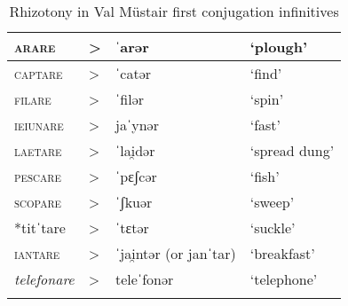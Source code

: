 \documentclass[output=paper,
modfonts
]{LSP/langsci}
\begin{document}
\begin{longtable}[]{@{}llll@{}}
\caption{Rhizotony in Val Müstair first conjugation infinitives}\\
\lsptoprule
\textsc{arare} & \textgreater{} & ˈarər & `plough'\tabularnewline
\midrule
\endhead
\textsc{captare} & \textgreater{} & ˈcatər & `find'\tabularnewline
\textsc{filare} & \textgreater{} & ˈfilər & `spin'\tabularnewline
\textsc{ieiunare} & \textgreater{} & jaˈynər & `fast'\tabularnewline
\textsc{laetare} & \textgreater{} & ˈlai̯dər & `spread
dung'\tabularnewline
\textsc{pescare} & \textgreater{} & ˈpɛʃcər & `fish'\tabularnewline
\textsc{scopare} & \textgreater{} & ˈʃkuər & `sweep'\tabularnewline
*titˈtare & \textgreater{} & ˈtɛtər & `suckle'\tabularnewline
\textsc{iantare} & \textgreater{} & ˈjai̯ntər (or janˈtar) &
`breakfast'\tabularnewline
\emph{telefonare} & \textgreater{} & teleˈfonər &
`telephone'\tabularnewline
\lspbottomrule
\end{longtable}
\end{document}
